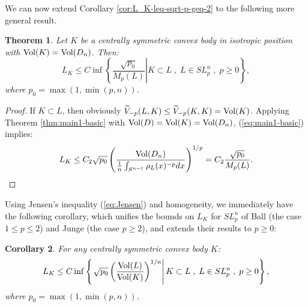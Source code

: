 \documentclass[12pt,oneside]{amsart}
\newtheorem{thm}{Theorem}[section] %
\newtheorem{cor}[thm]{Corollary}
\theoremstyle{definition}
\theoremstyle{remark}
\theoremstyle{proof}
\numberwithin{equation}{section}
\newcommand{\set}[1]{\left\{#1\right\}}
\newcommand{\brac}[1]{\left(#1\right)}
\newcommand{\Vol}[1]{\textnormal{Vol} (#1)}
\newcommand{\VolRatio}[2]{\brac{\frac{\Vol{#1}}{\Vol{#2}}}^{1/n}}
\begin{document}
\medskip

We can now extend Corollary \ref{cor:L_K-leq-sqrt-p-geq-2} to the
following more general result.

\begin{thm} \label{thm:main1-particular}
Let $K$ be a centrally symmetric convex body in isotropic
position with $\Vol{K}=\Vol{D_n}$. Then:
\[
L_K \leq C \inf \set{\left . \frac{\sqrt{p_0}}{M_p(L)}  \right | K
\subset L \; , \; L \in SL_p^n \; , \; p \geq 0},
\]
where $p_0 = \max(1,\min(p,n))$.
\end{thm}


\begin{proof}
If $K \subset L$, then obviously
$\widetilde{V}_{-p}(L,K) \leq \widetilde{V}_{-p}(K,K) = \Vol{K}$.
Applying Theorem \ref{thm:main1-basic} with $\Vol{D} = \Vol{K} =
\Vol{D_n}$, (\ref{eq:main1-basic}) implies:
\begin{equation} \label{eq:main1-particular}
L_K \leq C_2 \sqrt{p_0} \brac{\frac{\Vol{D_n}}{\frac{1}{n}
\int_{S^{n-1}} \rho_L(x)^{-p} dx}}^{1/p} = C_2
\frac{\sqrt{p_0}}{M_p(L)}.
\end{equation}
\end{proof}


Using Jensen's inequality (\ref{eq:Jensen}) and homogeneity, we
immediately have the following corollary, which unifies the
bounds on $L_K$ for $SL_p^n$ of Ball (the case $1 \leq p \leq 2$)
and Junge (the case $p\geq 2$), and extends their results to $p
\geq 0$:

\begin{cor} \label{cor:main1-particular}
For any centrally symmetric convex body $K$:
\[
L_K \leq C \inf \set{\left . \sqrt{p_0} \VolRatio{L}{K} \right | K
\subset L \; , \; L \in SL_p^n \; , \; p \geq 0},
\]
where $p_0 = \max(1,\min(p,n))$.
\end{cor}
\end{document}
